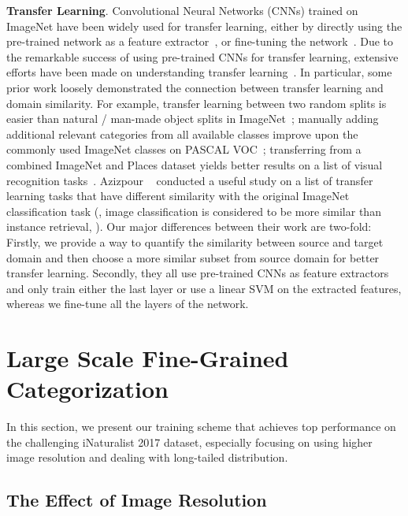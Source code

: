\documentclass[10pt,twocolumn,letterpaper]{article}
\begin{document}
\textbf{Transfer Learning}.
Convolutional Neural Networks (CNNs) trained on ImageNet have been widely used for transfer learning, either by directly using the pre-trained network as a feature extractor~\cite{cnn_off_the_shelf, decaf, places}, or fine-tuning the network~\cite{rcnn, transfer_cvpr14}.
Due to the remarkable success of using pre-trained CNNs for transfer learning, extensive efforts have been made on understanding transfer learning~\cite{how_transferable, azizpour2016factors, what_makes_imagenet_transfer, revisiting_data}.
In particular, some prior work loosely demonstrated the connection between transfer learning and domain similarity.
For example, transfer learning between two random splits is easier than natural / man-made object splits in ImageNet~\cite{how_transferable}; manually adding  additional relevant categories from all available classes improve upon the commonly used  ImageNet classes on PASCAL VOC~\cite{voc}; transferring from a combined ImageNet and Places dataset yields better results on a list of visual recognition tasks~\cite{places}.
Azizpour \etal~\cite{azizpour2016factors} conducted a useful study on a list of transfer learning tasks that have different similarity with the original ImageNet classification task (\eg, image classification is considered to be more similar than instance retrieval, \etc).
Our major differences between their work are two-fold:
Firstly, we provide a way to quantify the similarity between source and target domain and then choose a more similar subset from source domain for better transfer learning.
Secondly, they all use pre-trained CNNs as feature extractors and only train either the last layer or use a linear SVM on the extracted features, whereas we fine-tune all the layers of the network.






\section{Large Scale Fine-Grained Categorization}
\label{sec:lsfgvc}

In this section, we present our training scheme that achieves top performance on the challenging iNaturalist 2017 dataset, especially focusing on using higher image resolution and dealing with long-tailed distribution.


\subsection{The Effect of Image Resolution}
\label{sec:image_resolution}
\end{document}
